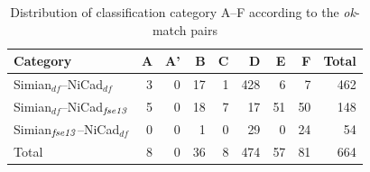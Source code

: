 \documentclass{IEEEtran}
\begin{document}
\begin{table}[H]
	\centering
	\caption{Distribution of classification category A--F  according to the \textit{ok}-match pairs}
	\label{tab:ok_classification}
	\begin{tabular}{|l|r|r|r|r|r|r|r|r|}
		\hline 
		Category   																										& A   	& 	A' 	& 	B  & C	   & D   	&	E   &	F   & Total  \\
		\hline
		Simian$_{df}$--NiCad$_{df}$   																	& 3 	& 0 	& 17	& 1 	& 428  & 6 		& 7 	&  462 \\
		Simian$_{df}$--NiCad$_{\textrm{\textit{fse13}}}$   									& 5 	& 0 	& 18 	& 7 	& 17 	 & 51 	  & 50 		&  148 \\
		Simian$_{\textrm{\textit{fse13}}}$--NiCad$_{df}$   									& 0 	& 0 	& 1 	& 0 	 & 29 	  & 0 		& 24 	& 54 \\
		\hline
		Total   &   8  &   0   &  36   &  8   &   474   &   57   & 81  & 664 \\
		\hline
	\end{tabular} 
\end{table}

\end{document}
